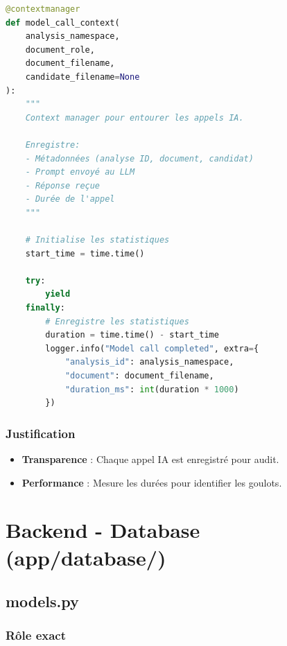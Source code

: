 \documentclass[12pt,a4paper,oneside]{book}
\begin{document}
\begin{lstlisting}[language=Python]
@contextmanager
def model_call_context(
    analysis_namespace,
    document_role,
    document_filename,
    candidate_filename=None
):
    """
    Context manager pour entourer les appels IA.
    
    Enregistre:
    - Métadonnées (analyse ID, document, candidat)
    - Prompt envoyé au LLM
    - Réponse reçue
    - Durée de l'appel
    """
    
    # Initialise les statistiques
    start_time = time.time()
    
    try:
        yield
    finally:
        # Enregistre les statistiques
        duration = time.time() - start_time
        logger.info("Model call completed", extra={
            "analysis_id": analysis_namespace,
            "document": document_filename,
            "duration_ms": int(duration * 1000)
        })
\end{lstlisting}

\subsubsection{Justification}

\begin{itemize}
    \item \textbf{Transparence} : Chaque appel IA est enregistré pour audit.
    
    \item \textbf{Performance} : Mesure les durées pour identifier les goulots.
\end{itemize}

\newpage


\section{Backend - Database (app/database/)}

\subsection{models.py}

\subsubsection{Rôle exact}
\end{document}
